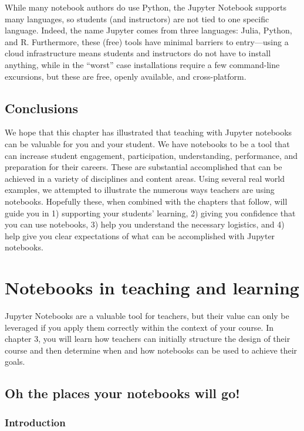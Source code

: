 \documentclass[]{book}
\begin{document}
While many notebook authors do use Python, the Jupyter Notebook supports
many languages, so students (and instructors) are not tied to one
specific language. Indeed, the name Jupyter comes from three languages:
Julia, Python, and R. Furthermore, these (free) tools have minimal
barriers to entry---using a cloud infrastructure means students and
instructors do not have to install anything, while in the ``worst'' case
installations require a few command-line excursions, but these are free,
openly available, and cross-platform.

\section{Conclusions}\label{conclusions}

We hope that this chapter has illustrated that teaching with Jupyter
notebooks can be valuable for you and your student. We have notebooks to
be a tool that can increase student engagement, participation,
understanding, performance, and preparation for their careers. These are
substantial accomplished that can be achieved in a variety of
disciplines and content areas. Using several real world examples, we
attempted to illustrate the numerous ways teachers are using notebooks.
Hopefully these, when combined with the chapters that follow, will guide
you in 1) supporting your students' learning, 2) giving you confidence
that you can use notebooks, 3) help you understand the necessary
logistics, and 4) help give you clear expectations of what can be
accomplished with Jupyter notebooks.

\chapter{Notebooks in teaching and
learning}\label{notebooks-in-teaching-and-learning}

Jupyter Notebooks are a valuable tool for teachers, but their value can
only be leveraged if you apply them correctly within the context of your
course. In chapter 3, you will learn how teachers can initially
structure the design of their course and then determine when and how
notebooks can be used to achieve their goals.

\section{Oh the places your notebooks will
go!}\label{oh-the-places-your-notebooks-will-go}

\subsection{Introduction}\label{introduction}
\end{document}
